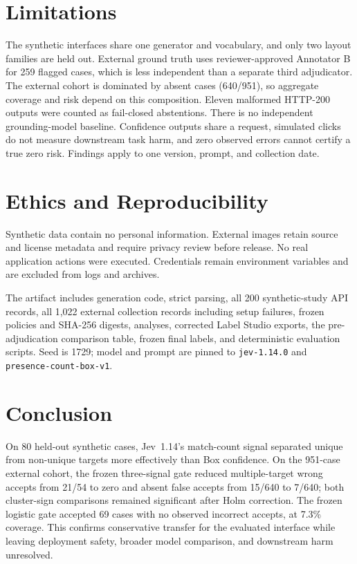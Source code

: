 \documentclass[10pt,twocolumn]{article}
\newcommand{\jev}{Jev~1.14}
\begin{document}
\section{Limitations}
The synthetic interfaces share one generator and vocabulary, and only two layout families are held out. External ground truth uses reviewer-approved Annotator B for 259 flagged cases, which is less independent than a separate third adjudicator. The external cohort is dominated by absent cases (640/951), so aggregate coverage and risk depend on this composition. Eleven malformed HTTP-200 outputs were counted as fail-closed abstentions. There is no independent grounding-model baseline. Confidence outputs share a request, simulated clicks do not measure downstream task harm, and zero observed errors cannot certify a true zero risk. Findings apply to one version, prompt, and collection date.

\section{Ethics and Reproducibility}
Synthetic data contain no personal information. External images retain source and license metadata and require privacy review before release. No real application actions were executed. Credentials remain environment variables and are excluded from logs and archives.

The artifact includes generation code, strict parsing, all 200 synthetic-study API records, all 1,022 external collection records including setup failures, frozen policies and SHA-256 digests, analyses, corrected Label Studio exports, the pre-adjudication comparison table, frozen final labels, and deterministic evaluation scripts. Seed is 1729; model and prompt are pinned to \texttt{jev-1.14.0} and \texttt{presence-count-box-v1}.

\section{Conclusion}
On 80 held-out synthetic cases, \jev's match-count signal separated unique from non-unique targets more effectively than Box confidence. On the 951-case external cohort, the frozen three-signal gate reduced multiple-target wrong accepts from 21/54 to zero and absent false accepts from 15/640 to 7/640; both cluster-sign comparisons remained significant after Holm correction. The frozen logistic gate accepted 69 cases with no observed incorrect accepts, at 7.3\% coverage. This confirms conservative transfer for the evaluated interface while leaving deployment safety, broader model comparison, and downstream harm unresolved.
\end{document}
